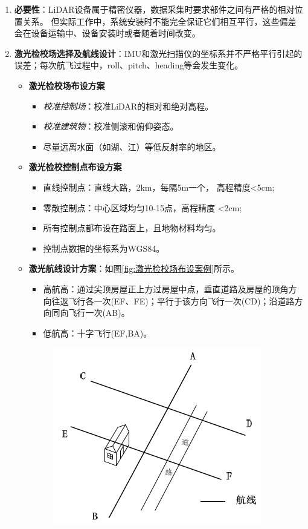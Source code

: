 \begin{enumerate}
	\item \textbf{必要性}：LiDAR设备属于精密仪器，数据采集时要求部件之间有严格的相对位置关系。
		但实际工作中，系统安装时不能完全保证它们相互平行，这些偏差会在设备运输中、设备安装时或者随着时间改变。
	\item \textbf{激光检校场选择及航线设计}：IMU和激光扫描仪的坐标系并不严格平行引起的误差；每次航飞过程中，roll、pitch、heading等会发生变化。
		\begin{itemize}
			\item \textbf{激光检校场布设方案}
				\begin{itemize}
					\item \textit{校准控制场}：校准LiDAR的相对和绝对高程。
					\item \textit{校准建筑物}：校准侧滚和俯仰姿态。
					\item 尽量远离水面（如湖、江）等低反射率的地区。
				\end{itemize}
			\item \textbf{激光检校控制点布设方案}
				\begin{itemize}
					\item 直线控制点：直线大路，2km，每隔5m一个， 高程精度<5cm;
					\item 零散控制点：中心区域均匀10-15点，高程精度 <2cm;
					\item 所有控制点都布设在路面上，且地物材料均匀。
					\item 控制点数据的坐标系为WGS84。
				\end{itemize}
			\item \textbf{激光航线设计方案}：如图\ref{fig:激光检校场布设案例}所示。
				\begin{itemize}
					\item 高航高：通过尖顶房屋正上方过房屋中点，垂直道路及房屋的顶角方向往返飞行各一次(EF、FE)；平行于该方向飞行一次(CD)；沿道路方向同向飞行一次(AB)。
					\item 低航高：十字飞行(EF,BA)。
				\end{itemize}
				\begin{figure}[htbp]
					\centering
					\includegraphics[width=0.4\linewidth]{figure/Chapter5/激光检校场布设案例}

\end{figure}
\end{itemize}
\end{enumerate}
